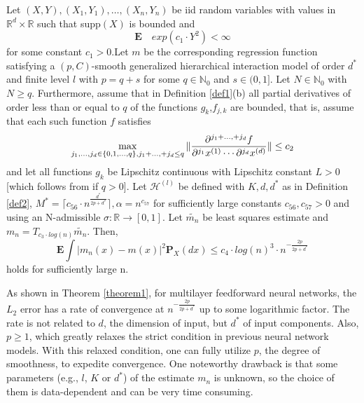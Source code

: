 \begin{theorem}
Let $(X,Y), (X_1, Y_1),\ldots, (X_n,Y_n)$ be iid random variables with values in $\mathbb{R}^d \times \mathbb{R}$ such that supp$(X)$ is bounded and \[\mathbf{E} \quad exp(c_1 \cdot Y^2)<\infty\] for some constant $c_1>0$.Let $m$ be the corresponding regression function satisfying a $(p,C)$-smooth generalized hierarchical interaction model of order $d^*$ and finite level $l$ with $p=q+s$ for some $q\in \mathbb{N}_0$ and $s \in (0,1]$. Let $N\in\mathbb{N}_0$ with $N\ge q$. Furthermore, assume that in Definition \ref{def1}(b) all partial derivatives of order less than or equal to $q$ of the functions $g_k$,$f_{j,k}$ are bounded, that is, assume that each such function $f$ satisfies \[\max_{j_1,\ldots,j_d\in\{0,1,\ldots,q\},\\ j_1+\ldots,+j_d\le q} \| \frac{\partial^{j_1+\ldots,+j_d}f}{\partial^{j_1}x^{(1)}\cdots \partial^{j_d}x^{(d)}}\| \le c_2\]
and let all functions $g_k$ be Lipschitz continuous with Lipschitz constant $L>0$ [which follows from if $q>0$]. Let $\mathcal{H}^{(l)}$ be defined with $K,d,d^*$ as in Definition \ref{def2}, $M^*=\lceil c_{56}\cdot n^{\frac{d^*}{2p+d^*}}\rceil, \alpha=n^{c_{57}}$ for sufficiently large constants $c_{56},c_{57}>0$ and using an N-admissible $\sigma:\mathbb{R} \rightarrow [0,1]$. Let $\tilde{m_n}$ be least squares estimate and $m_n=T_{c_3 \cdot log(n)}\tilde{m_n}$. Then, \[\mathbf{E}\int|m_n(x)-m(x)|^2\mathbf{P}_X(dx)\le c_4 \cdot log(n)^3 \cdot n^{-\frac{2p}{2p+d^*}}\] holds for sufficiently large n.
\label{theorem1}
\end{theorem}

As shown in Theorem \ref{theorem1}, for multilayer feedforward neural networks, the $L_2$ error has a rate of convergence at $n^{-\frac{2p}{2p+d^*}}$ up to some logarithmic factor. The rate is not related to $d$, the dimension of input, but $d^*$ of input components. Also, $p\ge 1$, which greatly relaxes the strict condition in previous neural network models. With this relaxed condition, one can fully utilize $p$, the degree of smoothness, to expedite convergence. One noteworthy drawback is that some parameters (e.g., $l$, $K$ or $d^*$) of the estimate $m_n$ is unknown, so the choice of them is data-dependent and can be very time consuming.